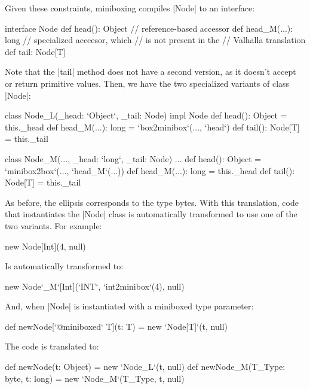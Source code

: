 Given these constraints, miniboxing compiles |Node| to an interface:

\begin{lstlisting-nobreak}
 interface Node {
   def head(): Object           // reference-based accessor
   def head_M(...): long // specialized acccesor, which
                                // is not present in the
                                // Valhalla translation
   def tail: Node[T]
 }
\end{lstlisting-nobreak}

Note that the |tail| method does not have a second version, as it doesn't accept or return primitive values. Then, we have the two specialized variants of class |Node|:

\begin{lstlisting-nobreak}
 class Node_L(_head: `Object`, _tail: Node) impl Node {
   def head(): Object = this._head
   def head_M(...): long = `box2minibox`(..., `head`)
   def tail(): Node[T] = this._tail
 }

 class Node_M(..., _head: `long`, _tail: Node) ... {
   def head(): Object = `minibox2box`(..., `head_M`(...))
   def head_M(...): long = this._head
   def tail(): Node[T] = this._tail
 }
\end{lstlisting-nobreak}

As before, the ellipsis corresponds to the type bytes. With this translation, code that instantiates the |Node| class is automatically transformed to use one of the two variants. For example:

\begin{lstlisting-nobreak}
 new Node[Int](4, null)
\end{lstlisting-nobreak}

Is automatically transformed to:

\begin{lstlisting-nobreak}
 new Node`_M`[Int](`INT`, `int2minibox`(4), null)
\end{lstlisting-nobreak}

And, when |Node| is instantiated with a miniboxed type parameter:

\begin{lstlisting-nobreak}
 def newNode[`@miniboxed` T](t: T) =
   new `Node[T]`(t, null)
\end{lstlisting-nobreak}

The code is translated to:

\begin{lstlisting-nobreak}
 def newNode(t: Object) =
   new `Node_L`(t, null)
 def newNode_M(T_Type: byte, t: long) =
   new `Node_M`(T_Type, t, null)
\end{lstlisting-nobreak}

